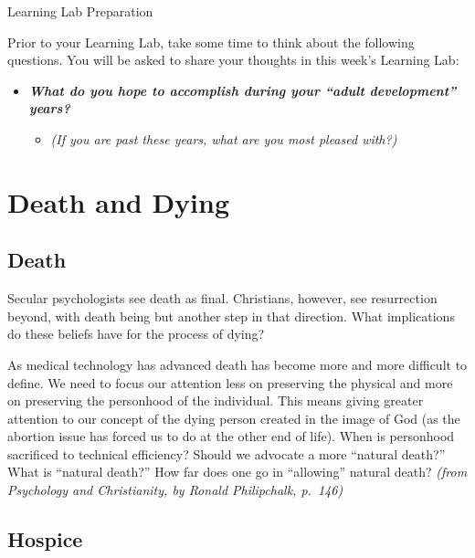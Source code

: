 \documentclass[
]{book}
\providecommand{\tightlist}{%
  \setlength{\itemsep}{0pt}\setlength{\parskip}{0pt}}
\begin{document}
{Learning Lab Preparation}

Prior to your Learning Lab, take some time to think about the following questions. You will be asked to share your thoughts in this week's Learning Lab:

\begin{itemize}
\tightlist
\item
  \textbf{\emph{What do you hope to accomplish during your ``adult development'' years?}}

  \begin{itemize}
  \tightlist
  \item
    \emph{(If you are past these years, what are you most pleased with?)}
  \end{itemize}
\end{itemize}

\hypertarget{death-and-dying}{%
\section{Death and Dying}\label{death-and-dying}}

\hypertarget{death}{%
\subsection*{Death}\label{death}}

Secular psychologists see death as final. Christians, however, see resurrection beyond, with death being but another step in that direction. What implications do these beliefs have for the process of dying?

As medical technology has advanced death has become more and more difficult to define. We need to focus our attention less on preserving the physical and more on preserving the personhood of the individual. This means giving greater attention to our concept of the dying person created in the image of God (as the abortion issue has forced us to do at the other end of life). When is personhood sacrificed to technical efficiency? Should we advocate a more ``natural death?'' What is ``natural death?'' How far does one go in ``allowing'' natural death? \emph{(from Psychology and Christianity, by Ronald Philipchalk, p.~146)}

\hypertarget{hospice}{%
\subsection*{Hospice}\label{hospice}}
\end{document}
